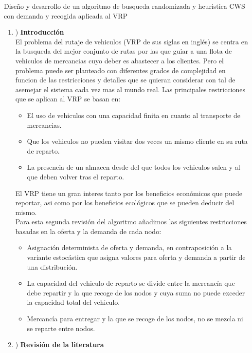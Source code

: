 \documentclass[11pt]{article} %
\begin{document}
\clearpage

{\fontsize{50}{60}\selectfont Diseño y desarrollo de un algoritmo de busqueda randomizada y heuristica CWS con demanda y recogida aplicada al VRP}

\renewcommand{\labelenumi}{\arabic{enumi}}
 \begin{enumerate}
   \item) \textbf{Introducción}\\[0.2cm]
El problema del rutaje de vehiculos (VRP de sus siglas en inglés) se centra en la busqueda del mejor conjunto de rutas por las que guiar a una flota de vehiculos de mercancias cuyo deber es abastecer a los clientes. Pero el problema puede ser planteado con diferentes grados de complejidad en funcion de las restricciones y detalles que se quieran considerar con tal de asemejar el sistema cada vez mas al mundo real. Las principales restricciones que se aplican al VRP se basan en:
   \begin{itemize}
       \item El uso de vehiculos con una capacidad finita en cuanto al transporte de mercancias.
       \item Que los vehiculos no pueden visitar dos veces un mismo cliente en su ruta de reparto.
       \item La presencia de un almacen desde del que todos los vehiculos salen y al que deben volver tras el reparto.
   \end{itemize} 
El VRP tiene un gran interes tanto por los beneficios económicos que puede reportar, asi como por los beneficios ecológicos que se pueden deducir del mismo.\\

Para esta segunda revisión del algoritmo añadimos las siguientes restricciones basadas en la oferta y la demanda de cada nodo:
   \begin{itemize}
	\item Asignación determinista de oferta y demanda, en contraposición a la variante estocástica que asigna valores para oferta y demanda a partir de una distribución.
	\item La capacidad del vehiculo de reparto se divide entre la mercancía que debe repartir y la que recoge de los nodos y cuya suma no puede exceder la capacidad total del vehiculo.
	\item Mercancía para entregar y la que se recoge de los nodos, no se mezcla ni se reparte entre nodos.
   \end{itemize} 

   \item) \textbf{Revisión de la literatura}


\end{enumerate}
\end{document}
